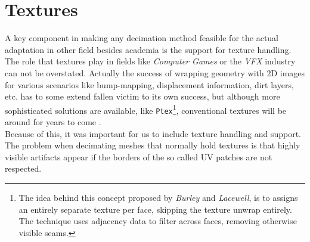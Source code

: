 \section{Textures}
\label{topstoc42}

A key component in making any decimation method feasible for the actual adaptation in other field besides academia is the support for texture handling.
The role that textures play in fields like \textit{Computer Games} or the \textit{VFX} industry can not be overstated.
Actually the success of wrapping geometry with 2D images for various scenarios like bump-mapping, displacement information, dirt layers, etc. has to some extend fallen victim to its own success, but although more sophisticated solutions are available, like \texttt{Ptex}\footnote{ The idea behind this concept proposed by \textit{Burley} and \textit{Lacewell}, is to assigns an entirely separate texture per face, skipping the texture unwrap entirely.  The technique uses adjacency data to filter across faces, removing otherwise visible seams.}, conventional textures will be around for years to come \citep[cf.][\texttt{Ptex} opposed to MeshColors is a fully-fledged concept that has been already successfully used]{Burley2008}.\\
Because of this, it was important for us to include texture handling and support.
The problem when decimating meshes that normally hold textures is that highly visible artifacts appear if the borders of the so called UV patches are not respected.

